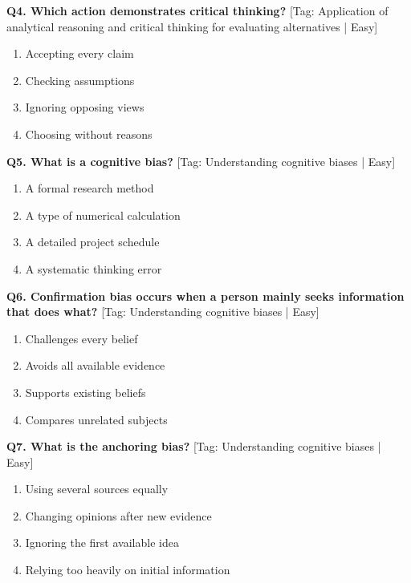 \noindent\textbf{Q4. Which action demonstrates critical thinking?} \hfill [Tag: Application of analytical reasoning and critical thinking for evaluating alternatives | Easy]
\begin{enumerate}[label=(\alph*),topsep=2pt,itemsep=1pt,partopsep=0pt,parsep=0pt]
    \item {Accepting every claim}
    \item {Checking assumptions}
    \item {Ignoring opposing views}
    \item {Choosing without reasons}
\end{enumerate}
\vspace{2mm}

\noindent\textbf{Q5. What is a cognitive bias?} \hfill [Tag: Understanding cognitive biases | Easy]
\begin{enumerate}[label=(\alph*),topsep=2pt,itemsep=1pt,partopsep=0pt,parsep=0pt]
    \item {A formal research method}
    \item {A type of numerical calculation}
    \item {A detailed project schedule}
    \item {A systematic thinking error}
\end{enumerate}
\vspace{2mm}

\noindent\textbf{Q6. Confirmation bias occurs when a person mainly seeks information that does what?} \hfill [Tag: Understanding cognitive biases | Easy]
\begin{enumerate}[label=(\alph*),topsep=2pt,itemsep=1pt,partopsep=0pt,parsep=0pt]
    \item {Challenges every belief}
    \item {Avoids all available evidence}
    \item {Supports existing beliefs}
    \item {Compares unrelated subjects}
\end{enumerate}
\vspace{2mm}

\noindent\textbf{Q7. What is the anchoring bias?} \hfill [Tag: Understanding cognitive biases | Easy]
\begin{enumerate}[label=(\alph*),topsep=2pt,itemsep=1pt,partopsep=0pt,parsep=0pt]
    \item {Using several sources equally}
    \item {Changing opinions after new evidence}
    \item {Ignoring the first available idea}
    \item {Relying too heavily on initial information}
\end{enumerate}
\vspace{2mm}

